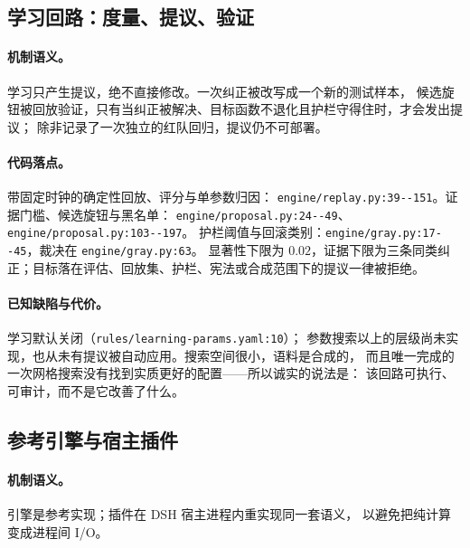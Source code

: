 \subsection{学习回路：度量、提议、验证}

\paragraph{机制语义。} 学习只产生提议，绝不直接修改。一次纠正被改写成一个新的测试样本，
候选旋钮被回放验证，只有当纠正被解决、目标函数不退化且护栏守得住时，才会发出提议；
除非记录了一次独立的红队回归，提议仍不可部署。

\paragraph{代码落点。} 带固定时钟的确定性回放、评分与单参数归因：
\texttt{engine/\allowbreak{}replay.\allowbreak{}py:\allowbreak{}39-\allowbreak{}-\allowbreak{}151}。证据门槛、候选旋钮与黑名单：
\texttt{engine/\allowbreak{}proposal.\allowbreak{}py:\allowbreak{}24-\allowbreak{}-\allowbreak{}49}、\texttt{engine/\allowbreak{}proposal.\allowbreak{}py:\allowbreak{}103-\allowbreak{}-\allowbreak{}197}。
护栏阈值与回滚类别：\texttt{engine/\allowbreak{}gray.\allowbreak{}py:\allowbreak{}17-\allowbreak{}-\allowbreak{}45}，裁决在 \texttt{engine/gray.py:63}。
显著性下限为 $0.02$，证据下限为三条同类纠正；目标落在评估、回放集、护栏、宪法或合成范围下的提议一律被拒绝。

\paragraph{已知缺陷与代价。} 学习默认关闭（\texttt{rules/\allowbreak{}learning-\allowbreak{}params.\allowbreak{}yaml:\allowbreak{}10}）；
参数搜索以上的层级尚未实现，也从未有提议被自动应用。搜索空间很小，语料是合成的，
而且唯一完成的一次网格搜索没有找到实质更好的配置——所以诚实的说法是：
该回路可执行、可审计，而不是它改善了什么。

\subsection{参考引擎与宿主插件}

\paragraph{机制语义。} 引擎是参考实现；插件在 DSH 宿主进程内重实现同一套语义，
以避免把纯计算变成进程间 I/O。

